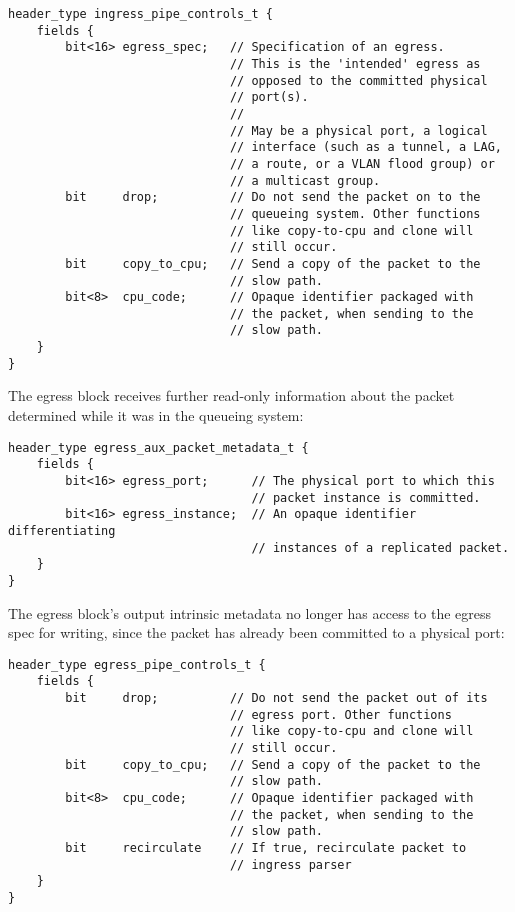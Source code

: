 \documentclass[12pt]{article}
\begin{document}
\begin{lstlisting}[style=P4style]
header_type ingress_pipe_controls_t {
    fields {
        bit<16> egress_spec;   // Specification of an egress.
                               // This is the 'intended' egress as
                               // opposed to the committed physical
                               // port(s).
                               //
                               // May be a physical port, a logical
                               // interface (such as a tunnel, a LAG,
                               // a route, or a VLAN flood group) or
                               // a multicast group.
        bit     drop;          // Do not send the packet on to the
                               // queueing system. Other functions
                               // like copy-to-cpu and clone will
                               // still occur.
        bit     copy_to_cpu;   // Send a copy of the packet to the
                               // slow path.
        bit<8>  cpu_code;      // Opaque identifier packaged with
                               // the packet, when sending to the
                               // slow path.
    }
}
\end{lstlisting}

The egress block receives further read-only information about the packet
determined while it was in the queueing system:

\begin{lstlisting}[style=P4style]
header_type egress_aux_packet_metadata_t {
    fields {
        bit<16> egress_port;      // The physical port to which this
                                  // packet instance is committed.
        bit<16> egress_instance;  // An opaque identifier differentiating
                                  // instances of a replicated packet.
    }
}
\end{lstlisting}

The egress block's output intrinsic metadata no longer has access to the egress
spec for writing, since the packet has already been committed to a physical
port:

\begin{lstlisting}[style=P4style]
header_type egress_pipe_controls_t {
    fields {
        bit     drop;          // Do not send the packet out of its
                               // egress port. Other functions
                               // like copy-to-cpu and clone will
                               // still occur.
        bit     copy_to_cpu;   // Send a copy of the packet to the
                               // slow path.
        bit<8>  cpu_code;      // Opaque identifier packaged with
                               // the packet, when sending to the
                               // slow path.
        bit     recirculate    // If true, recirculate packet to
                               // ingress parser
    }
}
\end{lstlisting}
\end{document}
